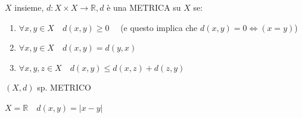 \documentclass[a4paper, oneside]{article}
\begin{document}
\begin{definition}
    $X$ insieme, $d:X\times X \to \mathbb{R}, d$ è una METRICA su $X$ se:
    \begin{enumerate}[$i)$]
        \item $\forall x,y \in X \quad d(x,y) \geq 0 \quad$ (e questo implica che $d(x,y)=0 \Leftrightarrow (x=y)$)
        \item $\forall x,y \in X \quad d(x,y) = d(y,x)$
        \item $\forall x,y,z \in X \quad d(x,y) \leq d(x,z) + d(z,y)$
    \end{enumerate}
\end{definition}
\begin{definition}
    $(X,d)$ sp. METRICO
\end{definition}
\begin{example}
    $X=\mathbb{R} \quad d(x,y) = |x-y|$\\
\end{example}
\end{document}

